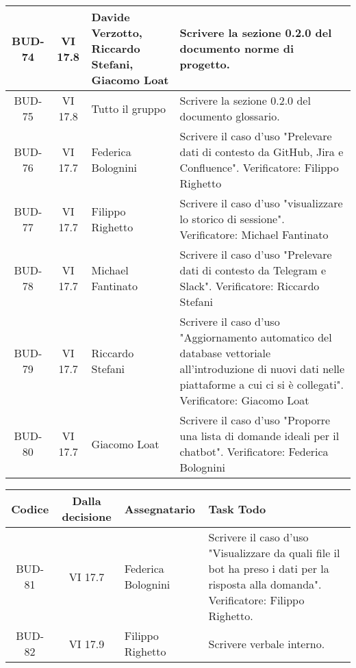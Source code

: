\begin{table}[htbp]
\begin{tabular}{|c|c|p{}|p{}|}
    \hline
    BUD-74 & VI 17.8 & Davide Verzotto, Riccardo Stefani, Giacomo Loat & Scrivere la sezione 0.2.0 del documento norme di progetto. \\
    \hline
    BUD-75 & VI 17.8 & Tutto il gruppo & Scrivere la sezione 0.2.0 del documento glossario. \\
    \hline
    BUD-76 & VI 17.7 & Federica Bolognini & Scrivere il caso d'uso "Prelevare dati di contesto da GitHub, Jira e Confluence". Verificatore: Filippo Righetto \\
    \hline
    BUD-77 & VI 17.7 & Filippo Righetto & Scrivere il caso d'uso "visualizzare lo storico di sessione". Verificatore: Michael Fantinato \\
    \hline
    BUD-78 & VI 17.7 & Michael Fantinato & Scrivere il caso d'uso "Prelevare dati di contesto da Telegram e Slack". Verificatore: Riccardo Stefani\\
    \hline
    BUD-79 & VI 17.7 & Riccardo Stefani & Scrivere il caso d'uso "Aggiornamento automatico del database vettoriale all'introduzione di nuovi dati nelle piattaforme a cui ci si è collegati". Verificatore: Giacomo Loat\\
    \hline
    BUD-80 & VI 17.7 & Giacomo Loat & Scrivere il caso d'uso "Proporre una lista di domande ideali per il chatbot". Verificatore: Federica Bolognini\\
    \hline
\end{tabular}
\end{table}

\vspace{0.5cm}
\newpage
\begin{table}[htbp]
\centering
{}
\begin{tabular}{|c|c|p{}|p{}|}
    \hline
    \rowcolor[gray]{0.75}
    \textbf{Codice} & \textbf{Dalla decisione} & \textbf{Assegnatario} & \textbf{Task Todo} \\ 
    \hline
    BUD-81 & VI 17.7 & Federica Bolognini & Scrivere il caso d'uso "Visualizzare da quali file il bot ha preso i dati per la risposta alla domanda". Verificatore: Filippo Righetto. \\ 
    \hline
    BUD-82 & VI 17.9 & Filippo Righetto & Scrivere verbale interno. \\ 
    \hline
\end{tabular}
\end{table}


